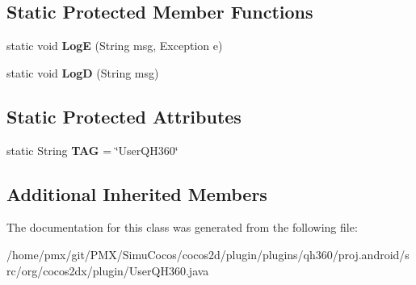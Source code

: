 \subsection*{Static Protected Member Functions}
\begin{DoxyCompactItemize}
\item 
\mbox{\label{classorg_1_1cocos2dx_1_1plugin_1_1UserQH360_a9b87bf886c861ea5e934c3dacba626f4}} 
static void {\bfseries LogE} (String msg, Exception e)
\item 
\mbox{\label{classorg_1_1cocos2dx_1_1plugin_1_1UserQH360_ac301865ee604fea86c4c9475a930f9d3}} 
static void {\bfseries LogD} (String msg)
\end{DoxyCompactItemize}
\subsection*{Static Protected Attributes}
\begin{DoxyCompactItemize}
\item 
\mbox{\label{classorg_1_1cocos2dx_1_1plugin_1_1UserQH360_a02954afdf66ce4b9dc0096f9b21bef50}} 
static String {\bfseries T\+AG} = \char`\"{}User\+Q\+H360\char`\"{}
\end{DoxyCompactItemize}
\subsection*{Additional Inherited Members}


The documentation for this class was generated from the following file\+:\begin{DoxyCompactItemize}
\item 
/home/pmx/git/\+P\+M\+X/\+Simu\+Cocos/cocos2d/plugin/plugins/qh360/proj.\+android/src/org/cocos2dx/plugin/User\+Q\+H360.\+java\end{DoxyCompactItemize}
